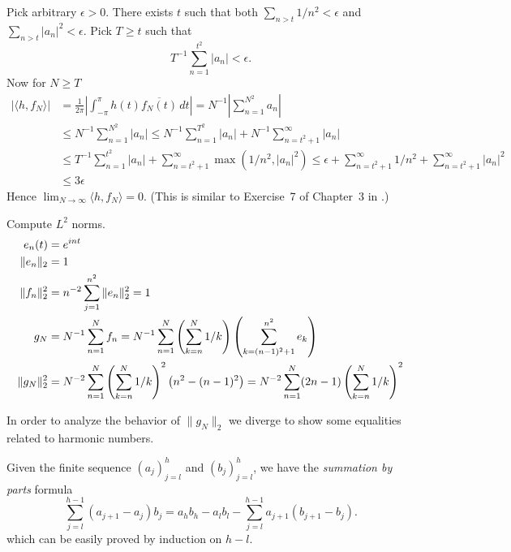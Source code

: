 \begin{enumerate}
Pick arbitrary \(\epsilon>0\).
There exists \(t\) such that
both \(\sum_{n>t}  1/n^2 < \epsilon\)
and \(\sum_{n>t}  |a_n|^2 < \epsilon\).
Pick \(T \geq t\) such that
\begin{equation*}
T^{-1} \sum_{n=1}^{t^2} |a_n| < \epsilon.
\end{equation*}
Now for \(N \geq T\)
\begin{align*}
\left|\langle h, f_N \rangle\right|
&= \frac{1}{2\pi} \left|\int_{-\pi}^\pi h(t)\overline{f_N(t)}\,dt\right|
 = N^{-1} \left| \sum_{n=1}^{N^2} a_n \right| \\
&\leq N^{-1} \sum_{n=1}^{N^2} |a_n|
  \leq N^{-1} \sum_{n=1}^{T^2} |a_n| + N^{-1} \sum_{n=t^2+1}^\infty |a_n|  \\
 &\leq T^{-1} \sum_{n=1}^{t^2} |a_n| + \sum_{n=t^2+1}^\infty \max(1/n^2, |a_n|^2)
  \leq \epsilon + \sum_{n=t^2+1}^\infty 1/n^2 + \sum_{n=t^2+1}^\infty |a_n|^2 \\
 &\leq 3\epsilon
\end{align*}
Hence \(\lim_{N\to\infty} \langle  h, f_N \rangle = 0\).
(This is similar to Exercise~7 of Chapter~3 in \cite{RudinPMA85}.)

Compute \(L^2\) norms.
\begin{align}
 e_n(t) &= e^{int} \label{eq:en:eint} \\
\|e_n\|_2 &= 1
  \notag \\
\|f_n\|_2^2 &=  n^{-2} \sum_{j=1}^{n^2} \|e_n\|_2^2 = 1 \notag \\
g_N &=  N^{-1}\sum_{n=1}^N f_n
    = N^{-1}\sum_{n=1}^N \left(\sum_{k=n}^N 1/k\right)
                       \left(\sum_{k=(n-1)^2+1}^{n^2} e_k\right) \notag \\
\|g_N\|_2^2 &=  N^{-2}\sum_{n=1}^N \left(\sum_{k=n}^N 1/k\right)^2
                                \left(n^2 - (n-1)^2\right)
            =  N^{-2}\sum_{n=1}^N (2n-1)\left(\sum_{k=n}^N 1/k\right)^2
  \label{eq:ex3.13:gN2}
\end{align}

In order to analyze the behavior of \(\|g_N\|_2\) we diverge
to show some equalities related to harmonic numbers.

Given the finite sequence
\((a_j)_{j=l}^{h}\) and
\((b_j)_{j=l}^{h}\),
we have the  \emph{summation by parts} formula
\begin{equation} \label{eq:sumbyparts}
\sum_{j=l}^{h-1} (a_{j+1} - a_j)b_j
 = a_{h} b_{h} - a_l b_l - \sum_{j=l}^{h-1} a_{j+1}(b_{j+1} - b_j).
\end{equation}
which can be easily proved by induction on \(h-l\).


\end{enumerate}
